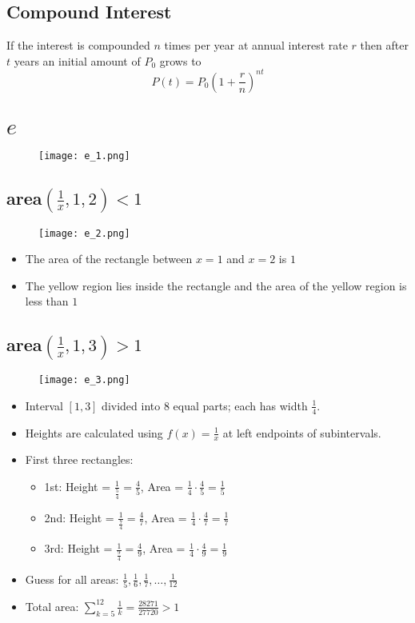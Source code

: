 \subsection{Compound Interest}
If the interest is compounded \(n\) times per year at annual interest rate \(r\) then after \(t\) years an initial amount of \(P_{0}\) grows to
\[P(t) = P_{0}(1+\frac{r}{n})^{nt}\]

\section{\( e \)}
\begin{figure}
  \texttt{[image: e\_1.png]}
\end{figure}

\subsection{area\((\frac{1}{x},1,2) < 1 \) }
\begin{figure}
  \texttt{[image: e\_2.png]}
\end{figure}
\begin{itemize}
  \item The area of the rectangle between \(x=1\) and \(x=2\) is \(1\)
  \item The yellow region lies inside the rectangle and the area of the yellow region is less than \(1\)
\end{itemize}

\subsection{area\((\frac{1}{x},1,3) > 1 \) }
\begin{figure}
  \texttt{[image: e\_3.png]}
\end{figure}
\begin{itemize}
  \item Interval \([1, 3]\) divided into 8 equal parts; each has width \(\frac{1}{4}\).
  \item Heights are calculated using \(f(x) = \frac{1}{x}\) at left endpoints of subintervals.
  \item First three rectangles:
  \begin{itemize}
      \item 1st: Height = \(\frac{1}{\frac{5}{4}} = \frac{4}{5}\), Area = \(\frac{1}{4} \cdot \frac{4}{5} = \frac{1}{5}\)
      \item 2nd: Height = \(\frac{1}{\frac{7}{4}} = \frac{4}{7}\), Area = \(\frac{1}{4} \cdot \frac{4}{7} = \frac{1}{7}\)
      \item 3rd: Height = \(\frac{1}{\frac{9}{4}} = \frac{4}{9}\), Area = \(\frac{1}{4} \cdot \frac{4}{9} = \frac{1}{9}\)
  \end{itemize}
  \item Guess for all areas: \(\frac{1}{5}, \frac{1}{6}, \frac{1}{7}, \dots, \frac{1}{12}\)
  \item Total area: \(\sum_{k=5}^{12} \frac{1}{k} = \frac{28271}{27720} > 1\)
\end{itemize}

